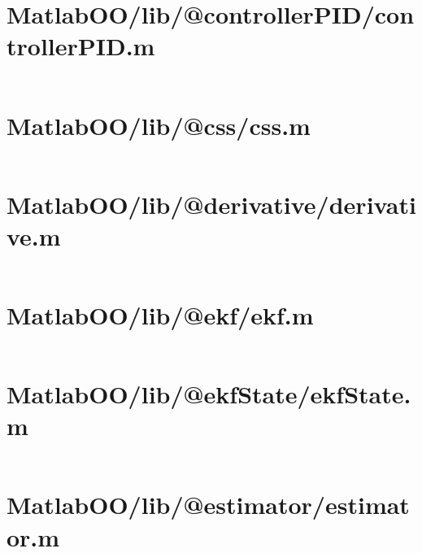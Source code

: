 \pagebreak
\section{MatlabOO/lib/@controllerPID/controllerPID.m}\label{code:MatlabOO/lib/@controllerPID/controllerPID.m}
\inputminted[linenos,fontsize=\scriptsize]{matlab}{/home/dcouture/git/mathyourlife/TSatPy/beta_versions/matlab_object_oriented/lib/@controllerPID/controllerPID.m}

\pagebreak
\section{MatlabOO/lib/@css/css.m}\label{code:MatlabOO/lib/@css/css.m}
\inputminted[linenos,fontsize=\scriptsize]{matlab}{/home/dcouture/git/mathyourlife/TSatPy/beta_versions/matlab_object_oriented/lib/@css/css.m}

\pagebreak
\section{MatlabOO/lib/@derivative/derivative.m}\label{code:MatlabOO/lib/@derivative/derivative.m}
\inputminted[linenos,fontsize=\scriptsize]{matlab}{/home/dcouture/git/mathyourlife/TSatPy/beta_versions/matlab_object_oriented/lib/@derivative/derivative.m}

\pagebreak
\section{MatlabOO/lib/@ekf/ekf.m}\label{code:MatlabOO/lib/@ekf/ekf.m}
\inputminted[linenos,fontsize=\scriptsize]{matlab}{/home/dcouture/git/mathyourlife/TSatPy/beta_versions/matlab_object_oriented/lib/@ekf/ekf.m}

\pagebreak
\section{MatlabOO/lib/@ekfState/ekfState.m}\label{code:MatlabOO/lib/@ekfState/ekfState.m}
\inputminted[linenos,fontsize=\scriptsize]{matlab}{/home/dcouture/git/mathyourlife/TSatPy/beta_versions/matlab_object_oriented/lib/@ekfState/ekfState.m}

\pagebreak
\section{MatlabOO/lib/@estimator/estimator.m}\label{code:MatlabOO/lib/@estimator/estimator.m}
\inputminted[linenos,fontsize=\scriptsize]{matlab}{/home/dcouture/git/mathyourlife/TSatPy/beta_versions/matlab_object_oriented/lib/@estimator/estimator.m}

